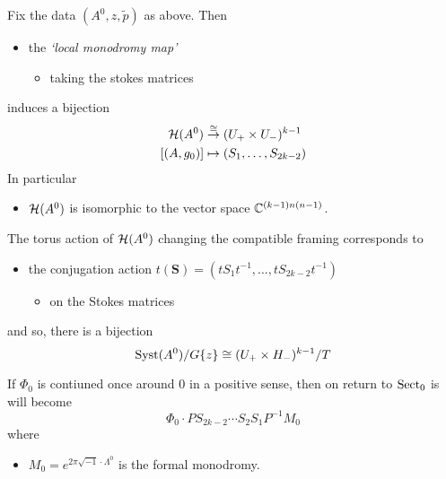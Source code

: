 \begin{thm}
  Fix the data $(A^0,z,\tilde p)$ as above.
  Then 
  \begin{itemize}
    \item the \emph{`local monodromy map'}
      \begin{itemize}
        \item taking the stokes matrices
      \end{itemize}
  \end{itemize}
  induces a bijection
  \begin{align*}
    \mathcal{H}(A^0)&\overset{\cong}{\to}(U_+\times U_-)^{k-1}
  \\ \left[(A,g_0)\right] &\mapsto(S_1,\dots,S_{2k-2})
  \end{align*}
  In particular
  \begin{itemize}
    \item $\mathcal{H}(A^0)$ is isomorphic to the vector space $\mathbb{C}^{(k-1)n(n-1)}$.
  \end{itemize}

  \begin{cor}
    The torus action of $\mathcal{H}(A^0)$ changing the compatible framing
    corresponds to
    \begin{itemize}
      \item the conjugation action
        $t(\textbf{S})=(tS_1t^{-1},\dots,tS_{2k-2}t^{-1})$
        \begin{itemize}
          \item on the Stokes matrices
        \end{itemize}
    \end{itemize}
    and so, there is a bijection
    \[
      \operatorname{Syst}(A^0)/G\{z\}\cong(U_+\times H_-)^{k-1}/T
    \]
  \end{cor}
  \begin{cor}
    If $\Phi_0$ is contiuned once around $0$ in a positive sense, then on
    return to $\operatorname{Sect}_0$ is will become
    \[
      \Phi_0\cdot PS_{2k-2}\cdots S_2S_1P^{-1}M_0
    \]
    where
    \begin{itemize}
      \item $M_0=e^{2\pi\sqrt{-1}\cdot\Lambda^0}$ is the formal monodromy.
    \end{itemize}
  \end{cor}
\end{thm}


